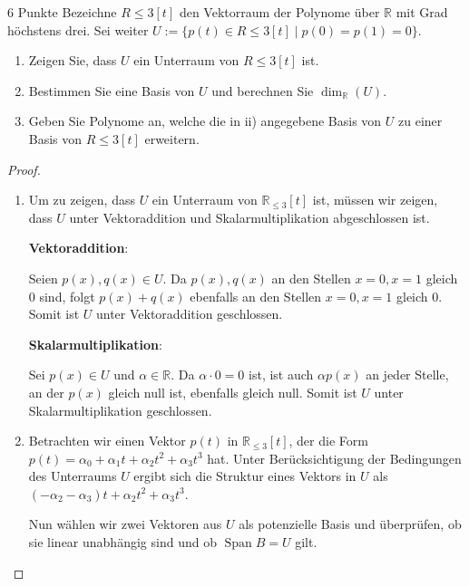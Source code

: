 \documentclass{problemset}
\begin{document}
\begin{problem}{6 Punkte}
Bezeichne $R\leq 3[t]$ den Vektorraum der Polynome über $\mathbb{R}$ mit Grad höchstens drei. Sei weiter $U := \{p(t) \in R\leq 3[t] \mid p(0) = p(1) = 0\}$.
\begin{enumerate}
    \item Zeigen Sie, dass $U$ ein Unterraum von $R\leq 3[t]$ ist.
    \item Bestimmen Sie eine Basis von $U$ und berechnen Sie
          $\dim_{\mathbb{R}}(U)$.
    \item Geben Sie Polynome an, welche die in ii) angegebene Basis von $U$ zu
          einer Basis von $R\leq 3[t]$ erweitern.
\end{enumerate}
\begin{proof}
    $ $

    \begin{enumerate}
        \item Um zu zeigen, dass $U$ ein Unterraum von $\mathbb{R}_{\leq 3}[t]$
              ist, müssen wir zeigen, dass $U$ unter Vektoraddition und
              Skalarmultiplikation abgeschlossen ist.

              \textbf{Vektoraddition}:

              Seien $p(x), q(x) \in U$. Da $p(x), q(x)$ an den Stellen $x = 0,
              x = 1$ gleich 0 sind, folgt $p(x) + q(x)$ ebenfalls an den
              Stellen $x = 0, x = 1$ gleich 0. Somit ist $U$ unter
              Vektoraddition geschlossen. \checkmark

              \textbf{Skalarmultiplikation}:

              Sei $p(x) \in U$ und $\alpha \in \mathbb{R}$. Da $\alpha \cdot 0
              = 0$ ist, ist auch $\alpha p(x)$ an jeder Stelle, an der $p(x)$
              gleich null ist, ebenfalls gleich null. Somit ist $U$ unter
              Skalarmultiplikation geschlossen. \checkmark
        \item Betrachten wir einen Vektor $p(t)$ in $\mathbb{R}_{\leq 3}[t]$,
              der die Form $p(t) = \alpha_0 + \alpha_1t + \alpha_2t^2 +
              \alpha_3t^3$ hat. Unter Berücksichtigung der Bedingungen des
              Unterraums $U$ ergibt sich die Struktur eines Vektors in $U$ als
              $(-\alpha_2 - \alpha_3)t + \alpha_2t^2 + \alpha_3t^3$.

              Nun wählen wir zwei Vektoren aus $U$ als potenzielle Basis und
              überprüfen, ob sie linear unabhängig sind und ob
              $\operatorname{Span} B = U$ gilt.


\end{enumerate}
\end{proof}
\end{problem}
\end{document}
